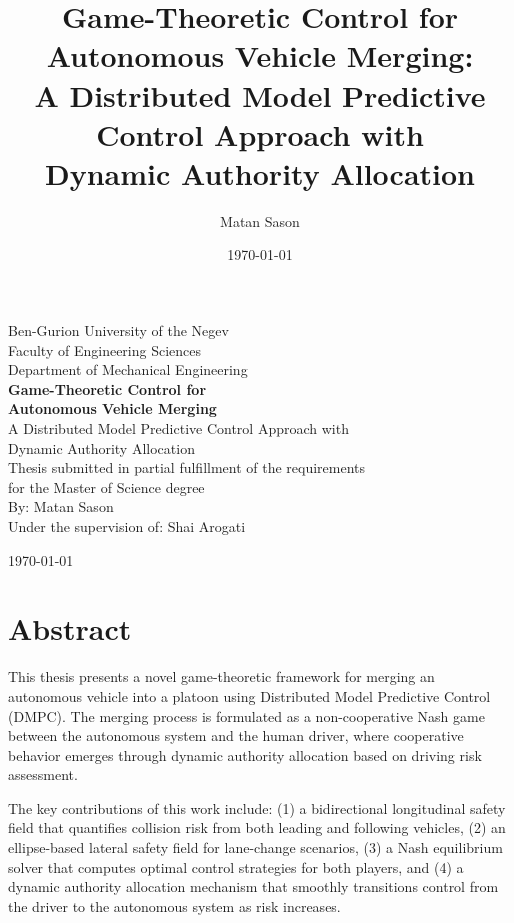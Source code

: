 \documentclass[12pt,a4paper,oneside]{report}
\title{Game-Theoretic Control for Autonomous Vehicle Merging:\\
A Distributed Model Predictive Control Approach with\\
Dynamic Authority Allocation}
\author{Matan Sason}
\date{\today}
\begin{document}
\begin{titlepage}
\centering
\vspace*{1cm}

{\Large Ben-Gurion University of the Negev}\\[0.5cm]
{\Large Faculty of Engineering Sciences}\\[0.5cm]
{\Large Department of Mechanical Engineering}\\[2cm]

{\Huge\bfseries Game-Theoretic Control for\\[0.3cm]
Autonomous Vehicle Merging}\\[0.5cm]
{\Large A Distributed Model Predictive Control Approach with\\
Dynamic Authority Allocation}\\[3cm]

{\Large Thesis submitted in partial fulfillment of the requirements\\
for the Master of Science degree}\\[2cm]

{\Large By: Matan Sason}\\[1cm]

{\Large Under the supervision of: Shai Arogati}\\[2cm]

\vfill

{\Large \today}
\end{titlepage}

\chapter*{Abstract}

This thesis presents a novel game-theoretic framework for merging an autonomous vehicle into a platoon using Distributed Model Predictive Control (DMPC). The merging process is formulated as a non-cooperative Nash game between the autonomous system and the human driver, where cooperative behavior emerges through dynamic authority allocation based on driving risk assessment.

The key contributions of this work include: (1) a bidirectional longitudinal safety field that quantifies collision risk from both leading and following vehicles, (2) an ellipse-based lateral safety field for lane-change scenarios, (3) a Nash equilibrium solver that computes optimal control strategies for both players, and (4) a dynamic authority allocation mechanism that smoothly transitions control from the driver to the autonomous system as risk increases.
\end{document}
